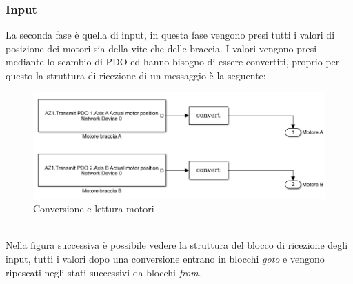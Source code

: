 \subsubsection*{Input}
La seconda fase è quella di input, in questa fase vengono presi tutti i valori di posizione dei motori sia della vite che delle braccia. I valori vengono presi mediante lo scambio di PDO ed hanno bisogno di essere convertiti, proprio per questo la struttura di ricezione di un messaggio è la seguente: 
\begin{figure}[ht]
	\begin{center}
		\includegraphics[scale=0.6]{Immagini/Sperimentale/convertS}
		\caption{Conversione e lettura motori}
		\label{fig:MotorConversion}
	\end{center}
\end{figure}
\\Nella figura successiva è possibile vedere la struttura del blocco di ricezione degli input, tutti i valori dopo una conversione entrano in blocchi \textit{goto} e vengono ripescati negli stati successivi da blocchi \textit{from}.

